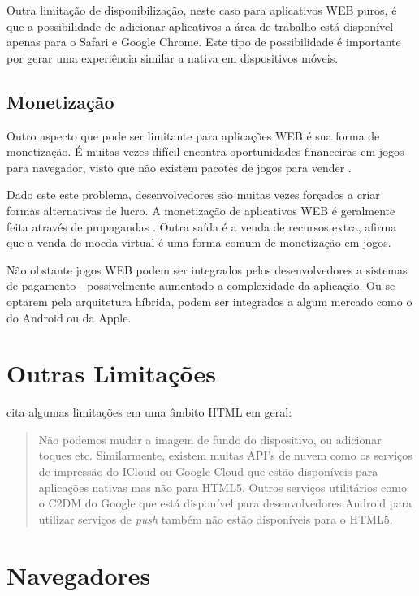 Outra limitação de disponibilização, neste caso para aplicativos
WEB puros, é que a possibilidade de adicionar aplicativos a área de
trabalho está disponível apenas para o Safari e Google Chrome. Este
tipo de possibilidade é importante por gerar uma experiência similar a
nativa em dispositivos móveis.

\subsection{Monetização}

Outro aspecto que pode ser limitante para aplicações WEB é sua forma
de monetização. É muitas vezes difícil encontra oportunidades
financeiras em jogos para navegador, visto que não existem pacotes de
jogos para vender \autocite[p. 44]{gameCommunities}.

Dado este este problema, desenvolvedores são muitas vezes forçados
a criar formas alternativas de lucro. A monetização de aplicativos
WEB é geralmente feita através de propagandas \autocite[p.
44]{gameCommunities}. Outra saída é a venda de recursos extra,
\cite[p. 44]{gameCommunities} afirma que a venda de moeda virtual é
uma forma comum de monetização em jogos.

Não obstante jogos WEB podem ser integrados pelos desenvolvedores
a sistemas de pagamento - possivelmente aumentado a complexidade
da aplicação. Ou se optarem pela arquitetura híbrida, podem ser
integrados a algum mercado como o do Android ou da Apple.

\section{Outras Limitações}

\citet{html5Tradeoffs} cita algumas limitações em uma âmbito HTML em geral: 

\begin{quote} 
Não podemos mudar a imagem de fundo do dispositivo, ou adicionar toques
etc. Similarmente, existem muitas API's de nuvem como os serviços
de impressão do ICloud ou Google Cloud que estão disponíveis para
aplicações nativas mas não para HTML5. Outros serviços utilitários
como o C2DM do Google que está disponível para desenvolvedores Android
para utilizar serviços de \textit{push} também não estão disponíveis
para o HTML5.
\end{quote}

\section{Navegadores}

